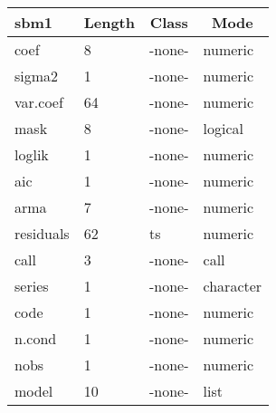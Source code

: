 \begin{table}[!tbp]
\begin{center}
\begin{tabular}{llll}
\hline\hline
\multicolumn{1}{l}{sbm1}&\multicolumn{1}{c}{Length}&\multicolumn{1}{c}{Class}&\multicolumn{1}{c}{Mode}\tabularnewline
\hline
coef& 8&-none-&numeric\tabularnewline
sigma2& 1&-none-&numeric\tabularnewline
var.coef&64&-none-&numeric\tabularnewline
mask& 8&-none-&logical\tabularnewline
loglik& 1&-none-&numeric\tabularnewline
aic& 1&-none-&numeric\tabularnewline
arma& 7&-none-&numeric\tabularnewline
residuals&62&ts&numeric\tabularnewline
call& 3&-none-&call\tabularnewline
series& 1&-none-&character\tabularnewline
code& 1&-none-&numeric\tabularnewline
n.cond& 1&-none-&numeric\tabularnewline
nobs& 1&-none-&numeric\tabularnewline
model&10&-none-&list\tabularnewline
\hline
\end{tabular}\end{center}

\end{table}
